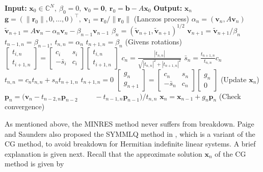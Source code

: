 \begin{algorithm}[H]\caption{{The MINRES method}}\label{alg:minres}\begin{algorithmic}[1]
\Statex\textbf{Input:} $\bm x_0\in\mathbb C^N,\ \beta_0=0,\ \bm v_0=\bm0,\ \bm r_0=\bm b-A\bm x_0$
\Statex\textbf{Output:} $\bm x_n$
\State $\bm g=(\|\bm r_0\|,0,\ldots,0)^{\top},\ \bm v_1=\bm r_0/\|\bm r_0\|$
\State (Lanczos {process})
\State $\alpha_n=(\bm v_n,A\bm v_n)$
\State $\widetilde{\bm v}_{n+1}=A\bm v_n-\alpha_n\bm v_n-\beta_{n-1}\bm v_{n-1}$
\State $\beta_n=(\widetilde{\bm v}_{n+1},\widetilde{\bm v}_{n+1})^{1/2}$
\State $\bm v_{n+1}=\widetilde{\bm v}_{n+1}/\beta_n$
\State $t_{n-1,n}=\beta_{n-1},\ t_{n,n}=\alpha_n$
\State $t_{n+1,n}=\beta_n$
\State (Givens {rotations})
\State $\begin{bmatrix}t_{i,n}\\t_{i+1,n}\end{bmatrix}=\begin{bmatrix}c_i&s_i\\-\bar s_i&c_i\end{bmatrix}\begin{bmatrix}t_{i,n}\\t_{i+1,n}\end{bmatrix}$
\EndFor
\State $c_n=\frac{|t_{n,n}|}{\sqrt{|t_{n,n}|^2+|t_{n+1,n}|^2}}$
\State $\bar s_n=\frac{t_{n+1,n}}{t_{n,n}}c_n$
\State $t_{n,n}=c_nt_{n,n}+s_nt_{n+1,n}$
\State $t_{n+1,n}=0$
\State $\begin{bmatrix}g_n\\g_{n+1}\end{bmatrix}=\begin{bmatrix}c_n&s_n\\-\bar s_n&c_n\end{bmatrix}\begin{bmatrix}g_n\\0\end{bmatrix}$
\State ({Update} $\bm x_n$)
\State $\bm p_n=(\bm v_n-t_{n-2,n}\bm p_{n-2}$
\State $\qquad-t_{n-1,n}\bm p_{n-1})/t_{n,n}$
\State $\bm x_n=\bm x_{n-1}+g_n\bm p_n$
\State ({Check convergence})
\EndFor\end{algorithmic}\end{algorithm}
{As mentioned above, the MINRES method never suffers from breakdown. Paige and Saunders also proposed the SYMMLQ method in , which is a variant of the CG method, to avoid breakdown for Hermitian indefinite linear systems. A brief explanation is given next. Recall that the approximate solution $\bm x_n$ of the CG method is given by}
